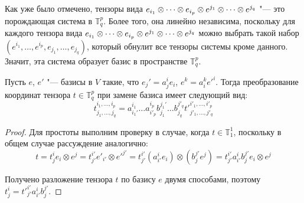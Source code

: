 \begin{note}
	Как уже было отмечено, тензоры вида $e_{i_1} \otimes \dots \otimes e_{i_p} \otimes e^{j_1} \hm{\otimes} \dots \otimes e^{j_q}$ "--- это порождающая система в $\mathbb T^p_q$. Более того, она линейно независима, поскольку для каждого тензора вида $e_{i_1} \otimes \dots \otimes e_{i_p} \otimes e^{j_1} \hm{\otimes} \dots \otimes e^{j_q}$ можно выбрать такой набор $(e^{i_1}, \dots, e^{i_p}, e_{j_1}, \dots, e_{j_q})$, который обнулит все тензоры системы кроме данного. Значит, эта система образует базис в пространстве $\mathbb{T}^p_q$.
\end{note}

\begin{theorem}
	Пусть $e$, $e'$ "--- базисы в $V$ такие, что $e_j' = a_j^ie_i$, $e^k = a^k_ie'^i$. Тогда преобразование координат тензора $t \in \mathbb T^p_q$ при замене базиса имеет следующий вид:
	\[t^{i_1, \dots, i_p}_{j_1, \dots, j_q} = a^{i_1}_{i_1'}\dots a^{i_p}_{i'_p}b^{j_1'}_{j_1}\dots b^{j'_q}_{j_q}t'^{i'_1, \dots, i'_p}_{j'_1, \dots, j'_q}\]
\end{theorem}

\begin{proof}
	Для простоты выполним проверку в случае, когда $t \in \mathbb{T}^1_1$, поскольку в общем случае рассуждение аналогично:
	\[t = t^i_je_i \otimes e^j = t^{i'}_{j'}e'_{i'} \otimes e'^{j'} = t^{i'}_{j'}(a_{i'}^ie_i) \otimes (b^{j'}_je^{j}) = t^{i'}_{j'}a^i_{i'}b^{j'}_j e_i \otimes e^j\]
	
	Получено разложение тензора $t$ по базису $e$ двумя способами, поэтому $t^i_j = t'^{i'}_{j'}a^i_{i'}b^{j'}_j$.
\end{proof}

